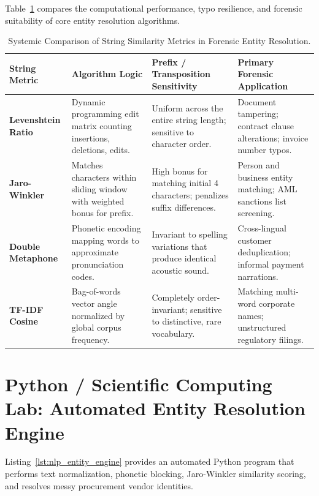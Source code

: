 Table~\ref{tab:comparison_string_metrics} compares the computational performance, typo resilience, and forensic suitability of core entity resolution algorithms.

\begin{table}[htbp]
\centering
\small
\begin{tabularx}{\textwidth}{lXXX}
\toprule
\textbf{String Metric} & \textbf{Algorithm Logic} & \textbf{Prefix / Transposition Sensitivity} & \textbf{Primary Forensic Application} \\
\midrule
\textbf{Levenshtein Ratio} & Dynamic programming edit matrix counting insertions, deletions, edits. & Uniform across the entire string length; sensitive to character order. & Document tampering; contract clause alterations; invoice number typos. \\
\addlinespace
\textbf{Jaro-Winkler} & Matches characters within sliding window with weighted bonus for prefix. & High bonus for matching initial 4 characters; penalizes suffix differences. & Person and business entity matching; AML sanctions list screening. \\
\addlinespace
\textbf{Double Metaphone} & Phonetic encoding mapping words to approximate pronunciation codes. & Invariant to spelling variations that produce identical acoustic sound. & Cross-lingual customer deduplication; informal payment narrations. \\
\addlinespace
\textbf{TF-IDF Cosine} & Bag-of-words vector angle normalized by global corpus frequency. & Completely order-invariant; sensitive to distinctive, rare vocabulary. & Matching multi-word corporate names; unstructured regulatory filings. \\
\bottomrule
\end{tabularx}
\caption{Systemic Comparison of String Similarity Metrics in Forensic Entity Resolution.}
\label{tab:comparison_string_metrics}
\end{table}

\section{Python / Scientific Computing Lab: Automated Entity Resolution Engine}

Listing~\ref{lst:nlp_entity_engine} provides an automated Python program that performs text normalization, phonetic blocking, Jaro-Winkler similarity scoring, and resolves messy procurement vendor identities.

